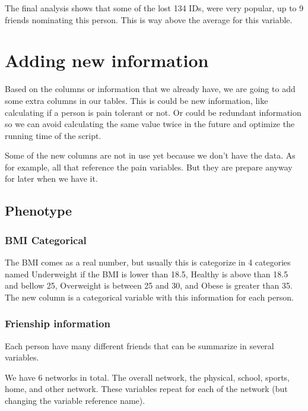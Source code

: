 The final analysis shows that some of the lost 134 IDs, were very popular, up to 9 friends nominating this person. This is way above the average for this variable.\vspace{3 mm}

\section{Adding new information}

Based on the columns or information that we already have, we are going to add some extra columns in our tables. This is could be new information, like calculating if a person is pain tolerant or not. Or  could be redundant information so we can avoid calculating the same value twice in the future and optimize the running time of the script.\vspace{3 mm}

Some of the new columns are not in use yet because we don't have the data. As for example, all that reference the pain variables. But they are prepare anyway for later when we have it.\vspace{3 mm}

	\subsection{Phenotype}

			\subsubsection{BMI Categorical}	
			
				The BMI comes as a real number, but usually this is categorize in 4 categories named Underweight if the BMI is lower than 18.5, Healthy is above than 18.5 and bellow 25, Overweight is between 25 and 30, and Obese is greater than 35. The new column is a categorical variable with this information for each person. \vspace{3 mm}			

            \label{section:friendship_information}
			\subsubsection{Frienship information}		
			
				Each person have many different friends that can be summarize in several variables. \vspace{3 mm}
				
				We have 6 networks in total. The overall network, the physical, school, sports, home, and other network. These variables repeat for each of the network (but changing the variable reference name). \vspace{3 mm}

